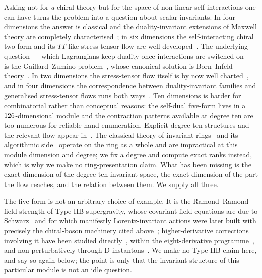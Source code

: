 \documentclass[
  aps,prd,
  reprint,
  letterpaper,
  amsmath,amssymb,
  nofootinbib,
  superscriptaddress
]{revtex4-2}
\theoremstyle{plain}
\begin{document}
Asking not for \emph{a} chiral theory but for the space of non-linear
self-inter\-actions one can have turns the problem into a question about scalar
invariants. In four dimensions the answer is classical and the duality-invariant
extensions of Maxwell theory are completely
characterised~\cite{Bandos:2020hgy,Bandos:2021rqy}; in six dimensions the
self-interacting chiral two-form and its $T\bar T$-like stress-tensor flow are
well developed~\cite{Townsend:2019ftg,Ferko:2024chiral,Brizio:2026ttbar}. The
underlying question --- which Lagrangians keep duality once interactions are
switched on --- is the Gaillard--Zumino
problem~\cite{Deser:1976iy,Gaillard:1981rj,Gibbons:1995cv}, whose canonical
solution is Born--Infeld theory~\cite{Born:1934gh}. In two dimensions the
stress-tensor flow itself is by now well
charted~\cite{Zamolodchikov:2004ce,Smirnov:2016lqw,Cavaglia:2016oda,Conti:2018tca,Bonelli:2018kik,Guica:2020eab},
and in four dimensions the correspondence between duality-invariant families and
generalised stress-tensor flows runs both ways~\cite{Ferko:2023wyi}. Ten
dimensions is harder for combinatorial rather than conceptual reasons: the
self-dual five-form lives in a $126$-dimensional module and the
contraction patterns available at degree ten are too numerous for reliable hand
enumeration. Explicit degree-ten structures and the relevant flow appear
in~\cite{Cederwall:2025invariants,Hutomo:2025chiral}. The classical theory of
invariant rings~\cite{Weyl:1946,Popov:1994} and its algorithmic
side~\cite{Derksen:2002,Sturmfels:2008} operate on the ring as a whole and are
impractical at this module dimension and degree; we fix a degree and compute
exact ranks instead, which is why we make no ring-presentation claim. What has been missing is
the exact dimension of the degree-ten invariant space, the exact dimension of
the part the flow reaches, and the relation between them. We supply all three.

The five-form is not an arbitrary choice of example. It is the Ramond--Ramond
field strength of Type IIB supergravity, whose covariant field equations are due
to Schwarz~\cite{Schwarz:1983qr} and for which manifestly Lorentz-invariant
actions were later built with precisely the chiral-boson machinery cited
above~\cite{DallAgata:1998ahf}; higher-derivative corrections involving it have
been studied directly~\cite{Paulos:2008tn}, within the eight-derivative
programme~\cite{Green:1997as,Liu:2022bfg}, and non-perturbatively through
D-instantons~\cite{Green:1997tv}. We make no Type IIB claim here, and say so
again below; the point is only that the invariant structure of this particular
module is not an idle question.
\end{document}
